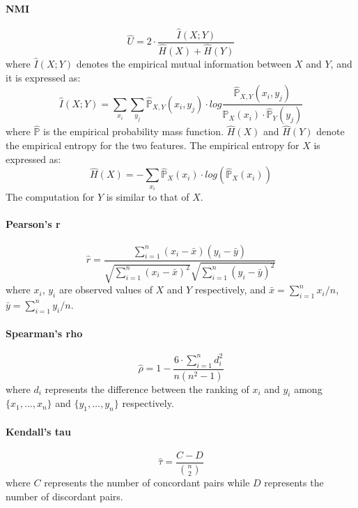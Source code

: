 \documentclass[twoside,11pt]{article}
\begin{document}
\paragraph{NMI}\citep{shannon2001mathematical}
\begin{equation*}
    \hat{U}=2\cdot\frac{\hat{I}(X;Y)}{\hat{H}(X)+\hat{H}(Y)}
\end{equation*}
where $\hat{I}(X;Y)$ denotes the empirical mutual information between $X$ and $Y$, and it is expressed as:
\begin{equation*}
    \hat{I}(X;Y) = \sum_{x_i}\sum_{y_j}\hat{\mathbb{P}}_{X,Y}(x_i,y_j)\cdot log\frac{\hat{\mathbb{P}}_{X,Y}(x_i,y_j)}{\hat{\mathbb{P}}_{X}(x_i)\cdot\hat{\mathbb{P}}_{Y}(y_j)}
\end{equation*}
where $\hat{\mathbb{P}}$ is the empirical probability mass function.
$\hat{H}(X)$ and $\hat{H}(Y)$ denote the empirical entropy for the two features. The empirical entropy for $X$ is expressed as:
\begin{equation*}
    \hat{H}(X)=-\sum_{x_i}\hat{\mathbb{P}}_{X}(x_i)\cdot log(\hat{\mathbb{P}}_{X}(x_i))
\end{equation*}
The computation for $Y$ is similar to that of $X$.

\paragraph{Pearson's r}\citep{lee1988thirteen}
\begin{equation*}
    \hat{r}=\frac{\sum_{i=1}^n (x_i-\bar{x})(y_i-\bar{y})}{\sqrt{\sum_{i=1}^n (x_i-\bar{x})^2}\sqrt{\sum_{i=1}^n (y_i-\bar{y})^2}}
\end{equation*}
where $x_i$, $y_i$ are observed values of $X$ and $Y$ respectively, and $\bar{x}=\sum_{i=1}^n x_i/n$, $\bar{y}=\sum_{i=1}^n y_i/n$.

\paragraph{Spearman's rho}\citep{spearman1961proof}
\begin{equation*}
    \hat\rho=1-\frac{6\cdot\sum_{i=1}^n d_i^2}{n(n^2-1)}
\end{equation*}
where $d_i$ represents the difference between the ranking of $x_i$ and $y_i$ among $\{x_1,\dots,x_n\}$ and $\{y_1,\dots,y_n\}$ respectively.

\paragraph{Kendall's tau}\citep{kendall1938new}
\begin{equation*}
    \hat\tau=\frac{C-D}{{n\choose 2}}
\end{equation*}
where $C$ represents the number of concordant pairs while $D$ represents the number of discordant pairs. 
\end{document}
